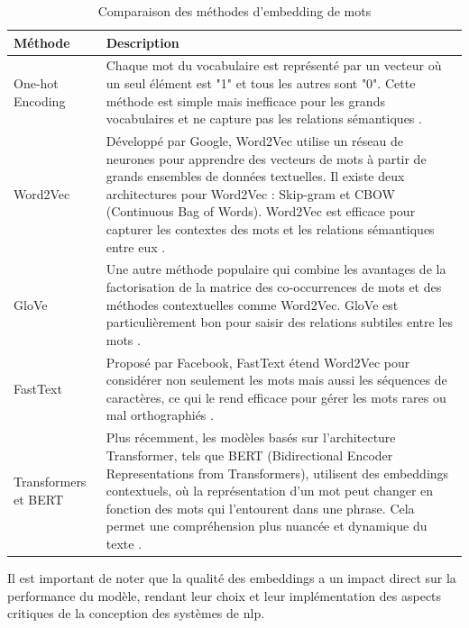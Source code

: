 \begin{table}[h]
\centering
\begin{tabular}{|p{3cm}|p{11cm}|}
\hline
\textbf{Méthode} & \textbf{Description} \\ \hline

One-hot Encoding & Chaque mot du vocabulaire est représenté par un vecteur où un seul élément est "1" et tous les autres sont "0". Cette méthode est simple mais inefficace pour les grands vocabulaires et ne capture pas les relations sémantiques \cite{onehotencoding}. \\ \hline
Word2Vec & Développé par Google, Word2Vec utilise un réseau de neurones pour apprendre des vecteurs de mots à partir de grands ensembles de données textuelles. Il existe deux architectures pour Word2Vec : Skip-gram et CBOW (Continuous Bag of Words). Word2Vec est efficace pour capturer les contextes des mots et les relations sémantiques entre eux \cite{mikolov2013efficient}. \\ \hline

GloVe & Une autre méthode populaire qui combine les avantages de la factorisation de la matrice des co-occurrences de mots et des méthodes contextuelles comme Word2Vec. GloVe est particulièrement bon pour saisir des relations subtiles entre les mots \cite{pennington2014glove}. \\ \hline

FastText & Proposé par Facebook, FastText étend Word2Vec pour considérer non seulement les mots mais aussi les séquences de caractères, ce qui le rend efficace pour gérer les mots rares ou mal orthographiés \cite{bojanowski2016enriching}. \\ \hline

Transformers et BERT & Plus récemment, les modèles basés sur l'architecture Transformer, tels que BERT (Bidirectional Encoder Representations from Transformers), utilisent des embeddings contextuels, où la représentation d'un mot peut changer en fonction des mots qui l'entourent dans une phrase. Cela permet une compréhension plus nuancée et dynamique du texte \cite{devlin2018bert}. \\ \hline
\end{tabular}

\caption{Comparaison des méthodes d'embedding de mots}
\label{table:word_embedding_methods}
\end{table}

Il est important de noter que la qualité des embeddings a un impact direct sur la performance du modèle, rendant leur choix et leur implémentation des aspects critiques de la conception des systèmes de \ac{nlp}. 

